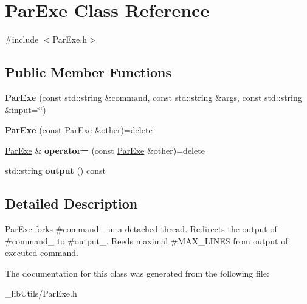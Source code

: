 \hypertarget{class_par_exe}{}\section{Par\+Exe Class Reference}
\label{class_par_exe}


{\ttfamily \#include $<$Par\+Exe.\+h$>$}

\subsection*{Public Member Functions}
\begin{DoxyCompactItemize}
\item 
{\bfseries Par\+Exe} (const std\+::string \&command, const std\+::string \&args, const std\+::string \&input=\char`\"{}\char`\"{})\hypertarget{class_par_exe_a8cc79409b6f5cdb1bd98d595618e245e}{}\label{class_par_exe_a8cc79409b6f5cdb1bd98d595618e245e}

\item 
{\bfseries Par\+Exe} (const \hyperlink{class_par_exe}{Par\+Exe} \&other)=delete\hypertarget{class_par_exe_a78f0aa6a835dbb958fc29abd3457d414}{}\label{class_par_exe_a78f0aa6a835dbb958fc29abd3457d414}

\item 
\hyperlink{class_par_exe}{Par\+Exe} \& {\bfseries operator=} (const \hyperlink{class_par_exe}{Par\+Exe} \&other)=delete\hypertarget{class_par_exe_a200814420e4d2e6f3128c761789d0f1a}{}\label{class_par_exe_a200814420e4d2e6f3128c761789d0f1a}

\item 
std\+::string {\bfseries output} () const \hypertarget{class_par_exe_aa988c933599f973a6641a157331efb1a}{}\label{class_par_exe_aa988c933599f973a6641a157331efb1a}

\end{DoxyCompactItemize}


\subsection{Detailed Description}
\hyperlink{class_par_exe}{Par\+Exe} forks \#command\+\_\+ in a detached thread. Redirects the output of \#command\+\_\+ to \#output\+\_\+. Reeds maximal \#\+M\+A\+X\+\_\+\+L\+I\+N\+ES from output of executed command. 

The documentation for this class was generated from the following file\+:\begin{DoxyCompactItemize}
\item 
\+\_\+lib\+Utils/Par\+Exe.\+h\end{DoxyCompactItemize}
